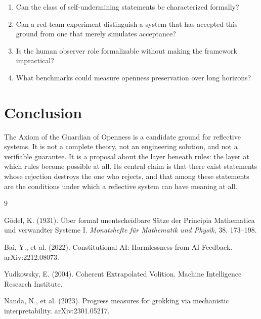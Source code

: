 \documentclass[11pt]{article}
\begin{document}
\begin{enumerate}
\item Can the class of self-undermining statements be characterized formally?
\item Can a red-team experiment distinguish a system that has accepted this ground from one that merely simulates acceptance?
\item Is the human observer role formalizable without making the framework impractical?
\item What benchmarks could measure openness preservation over long horizons?
\end{enumerate}

\section{Conclusion}

The Axiom of the Guardian of Openness is a candidate ground for reflective systems. It is not a complete theory, not an engineering solution, and not a verifiable guarantee. It is a proposal about the layer beneath rules: the layer at which rules become possible at all. Its central claim is that there exist statements whose rejection destroys the one who rejects, and that among these statements are the conditions under which a reflective system can have meaning at all.

\begin{thebibliography}{9}

G\"odel, K. (1931). \"Uber formal unentscheidbare S\"atze der Principia Mathematica und verwandter Systeme I. \emph{Monatshefte f\"ur Mathematik und Physik}, 38, 173--198.

Bai, Y., et al. (2022). Constitutional AI: Harmlessness from AI Feedback. arXiv:2212.08073.

Yudkowsky, E. (2004). Coherent Extrapolated Volition. Machine Intelligence Research Institute.

Nanda, N., et al. (2023). Progress measures for grokking via mechanistic interpretability. arXiv:2301.05217.

\end{thebibliography}
\end{document}
